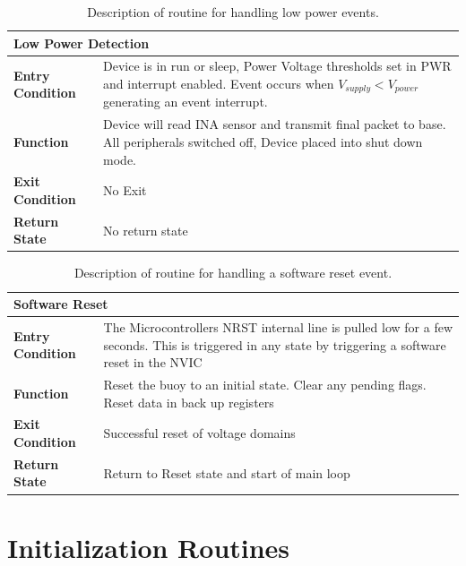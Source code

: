 \begin{table}[H]
    \centering
    \caption{Description of routine for handling low power events.}
    \begin{tabular}{|m{}|m{}|}
    \hline
    \multicolumn{2}{|l|}{\textbf{Low Power Detection}} \\
    \hline
    \textbf{Entry Condition}  & Device is in run or sleep, Power Voltage thresholds set in PWR and interrupt enabled. Event occurs when $V_{supply} < V_{power}$ generating an event interrupt. \\
    \hline
    \textbf{Function} & Device will read INA sensor and transmit final packet to base. All peripherals switched off, Device placed into shut down mode.\\
    \hline
    \textbf{Exit Condition} & No Exit\\
    \hline
    \textbf{Return State} & No return state\\
    \hline
    \end{tabular}

    \label{tab:Ev_desc_LPD}
\end{table}

\begin{table}[H]
    \centering
    \caption{Description of routine for handling a software reset event.}
    \begin{tabular}{|m{}|m{}|}
    \hline
    \multicolumn{2}{|l|}{\textbf{Software Reset}} \\
    \hline
    \textbf{Entry Condition}  & The Microcontrollers NRST internal line is pulled low for a few seconds. This is triggered in any state by triggering a software reset in the NVIC\\
    \hline
    \textbf{Function} & Reset the buoy to an initial state. Clear any pending flags. Reset data in back up registers\\
    \hline
    \textbf{Exit Condition} & Successful reset of voltage domains\\
    \hline
    \textbf{Return State} & Return to Reset state and start of main loop\\
    \hline
    \end{tabular}

    \label{tab:Ev_desc_SWR}
\end{table}


\section{Initialization Routines}

